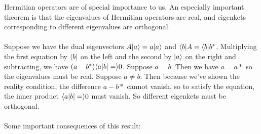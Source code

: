 \documentclass[11pt]{article}
\begin{document}
\noindent Hermitian operators are of special importance to us. An especially important theorem is that the eigenvalues of Hermitian operators are real, and eigenkets
corresponding to different eigenvalues are orthogonal.
\\
\\
\noindent Suppose we have the dual eigenvectors \(A\lvert a\rangle = a\lvert a\rangle\) and \(\langle b\rvert A = \langle b\rvert b^*\), Multiplying the first equation by \(\langle b\rvert\) on the left and the 
second by \(\lvert a\rangle\) on the right and subtracting, we have \((a - b^*)\langle a|b | = \rangle 0\). Suppose \(a = b\). Then we have \(a = a*\) so the eigenvalues must be real. Suppose
\(a \neq b\). Then because we've shown the reality condition, the difference \(a - b*\) cannot vanish, so to satisfy the equation, the inner product \(\langle a|b | = \rangle 0\) must vanish.
So different eigenkets must be orthogonal. 
\\
\\
Some important consequences of this result:
\end{document}
